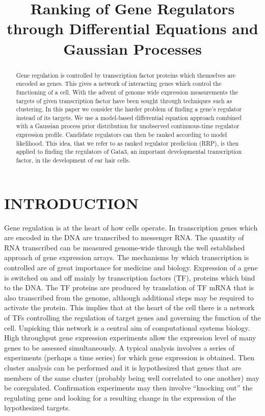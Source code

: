 \documentclass{article}
\title{Ranking of Gene Regulators through Differential Equations and Gaussian Processes}
\begin{document}
\maketitle

\begin{abstract}
  Gene regulation is controlled by transcription factor proteins which
  themselves are encoded as genes. This gives a network of interacting
  genes which  control the functioning of  a cell. With  the advent of
  genome   wide   expression  measurements   the   targets  of   given
  transcription  factor have  been sought  through techniques  such as
  clustering. In this paper we  consider the harder problem of finding
  a  gene's regulator instead  of its  targets.  We  use a  model-based
  differential  equation  approach combined  with  a Gaussian  process
  prior distribution for unobserved continuous-time regulator expression
  profile.  Candidate regulators can then be ranked according to model
  likelihood.  This idea,
  that  we refer  to as  ranked  regulator prediction  (RRP), is  then
  applied   to  finding   the  regulators   of  Gata3,   an  important
  developmental transcription  factor, in the development  of ear hair
  cells.
\end{abstract}

\sloppy

\section{INTRODUCTION}

Gene regulation is at the heart of how cells operate. In transcription
genes  which are  encoded in  the  DNA are  transcribed to  messenger
RNA.  The  quantity of  RNA  transcribed  can  be measured  genome-wide
through the  well established approach of gene  expression arrays. The
mechanisms  by   which  transcription  is  controlled   are  of  great
importance for medicine and biology.  Expression of a gene is switched
on  and off mainly by  transcription factors  (TF), proteins
which bind to the DNA. The  TF proteins are produced by translation of
TF mRNA  that  is  also transcribed from  the genome, although
additional steps may be required to activate the protein.
This implies that  at the heart  of the
cell there is a network of TFs controlling the regulation of target genes and
governing  the function  of  the  cell. Unpicking  this  network is  a
central  aim of  computational systems  biology. High  throughput gene
expression experiments allow the expression  level of many genes to be
assessed  simultaneously.  A typical  analysis  involves  a series  of
experiments  (perhaps a  time  series) for  which  gene expression  is
obtained.  Then   cluster  analysis  can   be  performed  and   it  is
hypothesized that genes that are  members of the same cluster
(probably being well correlated   to  one   another)  may   be
coregulated.  Confirmation  experiments  may then  involve  ``knocking
out'' the  regulating gene and looking  for a resulting  change in the
expression of the hypothesized targets.
\end{document}
